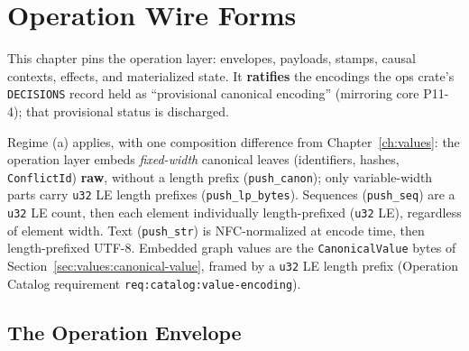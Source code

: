 \documentclass[11pt,letterpaper]{report}
\newcounter{requirement}[chapter]
\begin{document}
\chapter{Operation Wire Forms}
\label{ch:ops}

This chapter pins the operation layer: envelopes, payloads, stamps, causal
contexts, effects, and materialized state. It \textbf{ratifies} the
encodings the ops crate's \texttt{DECISIONS} record held as ``provisional
canonical encoding'' (mirroring core P11-4); that provisional status is
discharged.

Regime (a) applies, with one composition difference from
Chapter~\ref{ch:values}: the operation layer embeds \emph{fixed-width}
canonical leaves (identifiers, hashes, \texttt{ConflictId}) \textbf{raw},
without a length prefix (\texttt{push\_canon}); only variable-width parts
carry \texttt{u32} LE length prefixes (\texttt{push\_lp\_bytes}). Sequences
(\texttt{push\_seq}) are a \texttt{u32} LE count, then each element
individually length-prefixed (\texttt{u32} LE), regardless of element width.
Text (\texttt{push\_str}) is NFC-normalized at encode time, then
length-prefixed UTF-8. Embedded graph values are the
\texttt{CanonicalValue} bytes of Section~\ref{sec:values:canonical-value},
framed by a \texttt{u32} LE length prefix (Operation Catalog requirement
\texttt{req:catalog:value-encoding}).

\section{The Operation Envelope}
\label{sec:ops:envelope}
\end{document}
